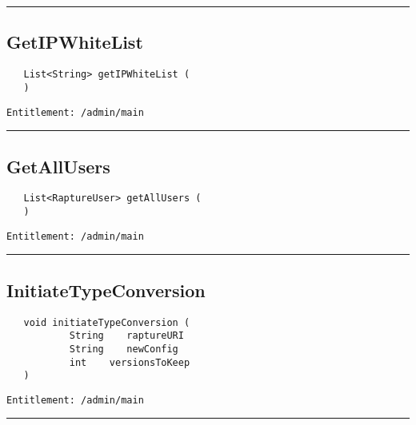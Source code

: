 \rule{12cm}{2pt}
\subsection{GetIPWhiteList}
\label{Api:GetIPWhiteList}
\begin{Verbatim}
   List<String> getIPWhiteList (
   )
\end{Verbatim}
\begin{Verbatim}[formatcom=\color{Maroon}]
  Entitlement: /admin/main
\end{Verbatim}



\rule{12cm}{2pt}
\subsection{GetAllUsers}
\label{Api:GetAllUsers}
\begin{Verbatim}
   List<RaptureUser> getAllUsers (
   )
\end{Verbatim}
\begin{Verbatim}[formatcom=\color{Maroon}]
  Entitlement: /admin/main
\end{Verbatim}



\rule{12cm}{2pt}
\subsection{InitiateTypeConversion}
\label{Api:InitiateTypeConversion}
\begin{Verbatim}
   void initiateTypeConversion (
           String    raptureURI
           String    newConfig
           int    versionsToKeep
   )
\end{Verbatim}
\begin{Verbatim}[formatcom=\color{Maroon}]
  Entitlement: /admin/main
\end{Verbatim}



\rule{12cm}{2pt}

